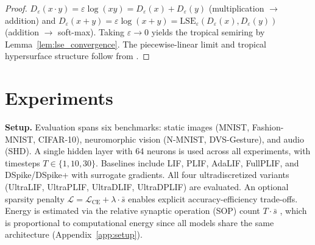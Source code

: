 \documentclass{article}
\theoremstyle{plain}
\theoremstyle{definition}
\theoremstyle{remark}
\newcommand{\lse}{\mathrm{LSE}}
\newcommand{\eps}{\varepsilon}
\begin{document}
\begin{proof}
$D_\eps(x \cdot y) = \eps\log(xy) = D_\eps(x) + D_\eps(y)$ (multiplication $\to$ addition) and $D_\eps(x + y) = \eps\log(x+y) = \lse_\eps(D_\eps(x), D_\eps(y))$ (addition $\to$ soft-max). Taking $\eps \to 0$ yields the tropical semiring by Lemma~\ref{lem:lse_convergence}. The piecewise-linear limit and tropical hypersurface structure follow from \citet{zhang2018tropical}.
\end{proof}

\section{Experiments}
\label{sec:experiments}

\textbf{Setup.} Evaluation spans six benchmarks: static images (MNIST, Fashion-MNIST, CIFAR-10), neuromorphic vision (N-MNIST, DVS-Gesture), and audio (SHD). A single hidden layer with 64 neurons is used across all experiments, with timesteps $T \in \{1, 10, 30\}$. Baselines include LIF, PLIF, AdaLIF, FullPLIF, and DSpike/DSpike+ with surrogate gradients. All four ultradiscretized variants (UltraLIF, UltraPLIF, UltraDLIF, UltraDPLIF) are evaluated. An optional sparsity penalty $\mathcal{L} = \mathcal{L}_\text{CE} + \lambda \cdot \bar{s}$ enables explicit accuracy-efficiency trade-offs. Energy is estimated via the relative synaptic operation (SOP) count $T \cdot \bar{s}$ \citep{lemaire2023analytical}, which is proportional to computational energy since all models share the same architecture (Appendix~\ref{app:setup}).
\end{document}
